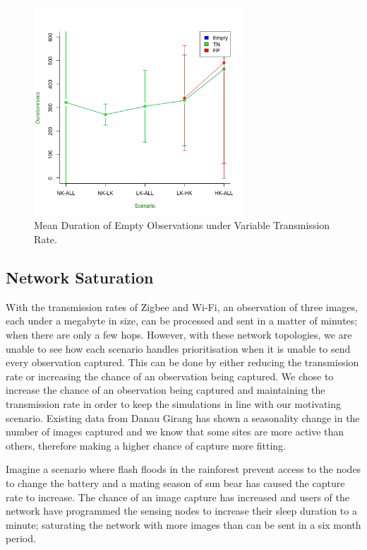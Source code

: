 	\begin{figure}[h]
	\centering
	\includegraphics[width=0.70\textwidth]{Chap7/figures/real_empty_dur}
	\caption{Mean Duration of Empty Observations under Variable Transmission Rate.}
	\label{fig:real:empty:dur}
	\end{figure}	

\subsection{Network Saturation}

With the transmission rates of Zigbee and Wi-Fi, an observation of three images, each under a megabyte in size, can be processed and sent in a matter of minutes; when there are only a few hops. However, with these network topologies, we are unable to see how each scenario handles prioritisation when it is unable to send every observation captured. This can be done by either reducing the transmission rate or increasing the chance of an observation being captured. We chose to increase the chance of an observation being captured and maintaining the transmission rate in order to keep the simulations in line with our motivating scenario. Existing data from Danau Girang has shown a seasonality change in the number of images captured and we know that some sites are more active than others, therefore making a higher chance of capture more fitting. 

Imagine a scenario where flash floods in the rainforest prevent access to the nodes to change the battery and a mating season of sun bear has caused the capture rate to increase. The chance of an image capture has increased and users of the network have programmed the sensing nodes to increase their sleep duration to a minute; saturating the network with more images than can be sent in a six month period.

